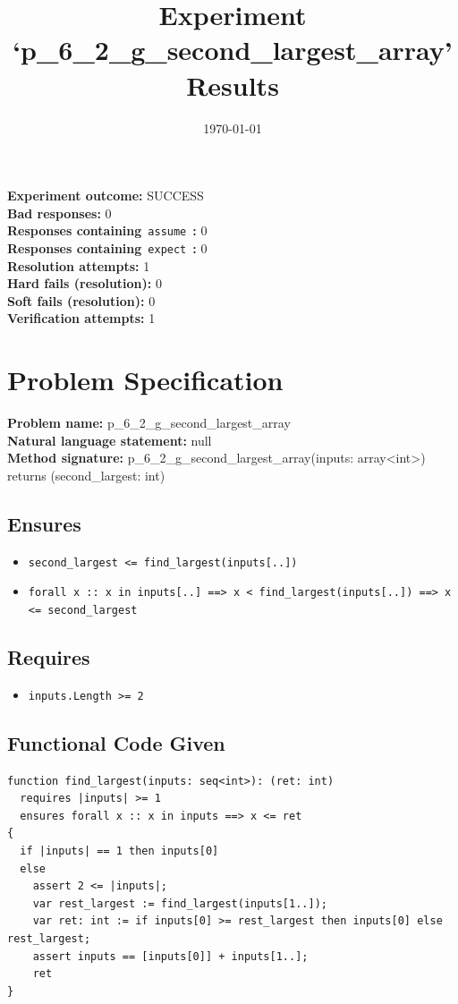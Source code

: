 \documentclass{article}
\begin{document}
\title{Experiment `p\_6\_2\_g\_second\_largest\_array' Results}
\author{\today}
\date{}
\maketitle
\textbf{Experiment outcome: }SUCCESS
\\\textbf{Bad responses: }0
\\\textbf{Responses containing}~\texttt{assume}~\textbf{: }0
\\\textbf{Responses containing}~\texttt{expect}~\textbf{: }0
\\\textbf{Resolution attempts: }1
\\\textbf{Hard fails (resolution): }0
\\\textbf{Soft fails (resolution): }0
\\\textbf{Verification attempts: }1
\section*{Problem Specification}
\textbf{Problem name: }p\_6\_2\_g\_second\_largest\_array
\\\textbf{Natural language statement: }null
\\\textbf{Method signature: }p\_6\_2\_g\_second\_largest\_array(inputs: array<int>) returns (second\_largest: int)
\subsection*{Ensures}
\begin{itemize}
\item \texttt{second\_largest <= find\_largest(inputs[..])}
\item \texttt{forall x :: x in inputs[..] ==> x < find\_largest(inputs[..]) ==> x <= second\_largest}
\end{itemize}
\subsection*{Requires}
\begin{itemize}
\item \texttt{inputs.Length >= 2}
\end{itemize}
\subsection*{Functional Code Given}
\begin{lstlisting}
function find_largest(inputs: seq<int>): (ret: int)
  requires |inputs| >= 1
  ensures forall x :: x in inputs ==> x <= ret
{
  if |inputs| == 1 then inputs[0]
  else 
    assert 2 <= |inputs|;
    var rest_largest := find_largest(inputs[1..]);
    var ret: int := if inputs[0] >= rest_largest then inputs[0] else rest_largest;
    assert inputs == [inputs[0]] + inputs[1..]; 
    ret 
} 
\end{lstlisting}
\clearpage
\end{document}
